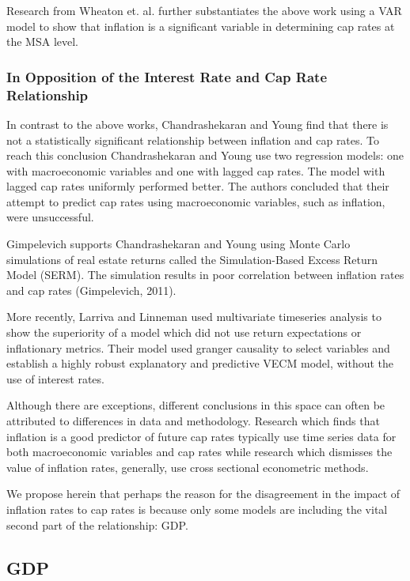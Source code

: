 Research from Wheaton et. al. \citep*{wheaton2001real} further substantiates the above work using a VAR model to show that inflation is a significant variable in determining cap rates at the MSA level. 

\subsubsection{In Opposition of the Interest Rate and Cap Rate Relationship}
In contrast to the above works, Chandrashekaran and Young \citep*{chandrashekaran2000predictability} find that there is not a statistically significant relationship between inflation and cap rates. To reach this conclusion Chandrashekaran and Young use two regression models: one with macroeconomic variables and one with lagged cap rates. The model with lagged cap rates uniformly performed better. The authors concluded that their attempt to predict cap rates using macroeconomic variables, such as inflation, were unsuccessful. 

Gimpelevich \citep*{Gimpelevich2011} supports Chandrashekaran and Young using Monte Carlo simulations of real estate returns called the Simulation-Based Excess Return Model (SERM). The simulation results in poor correlation between inflation rates and cap rates (Gimpelevich, 2011).

More recently, Larriva and Linneman \citep*{larriva2021determinants} used multivariate timeseries analysis to show the superiority of a model which did not use return expectations or inflationary metrics. Their model used granger causality to select variables and establish a highly robust explanatory and predictive VECM model, without the use of interest rates.

Although there are exceptions, different conclusions in this space can often be attributed to differences in data and methodology. Research which finds that inflation is a good predictor of future cap rates typically use time series data for both macroeconomic variables and cap rates while research which dismisses the value of inflation rates, generally, use cross sectional econometric methods.

We propose herein that perhaps the reason for the disagreement in the impact of inflation rates to cap rates is because only some models are including the vital second part of the relationship: GDP.


\subsection{GDP}

